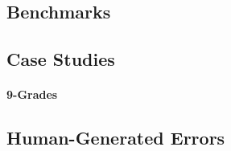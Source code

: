 \subsection{Benchmarks}

\subsection{Case Studies}

\paragraph{9-Grades}

\subsection{Human-Generated Errors}


